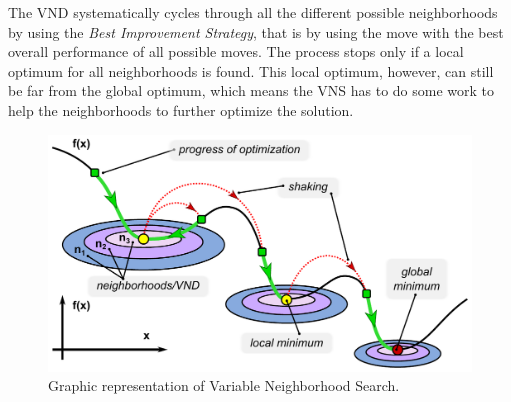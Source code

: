 \documentclass[paper = a4, fontsize = 10pt]{scrartcl}
\begin{document}
{%

The VND systematically cycles through all the different possible neighborhoods by using the \emph{Best Improvement Strategy}, that is by using the move with the best overall performance of all possible moves. The process stops only if a local optimum for all neighborhoods is found. This local optimum, however, can still be far from the global optimum, which means the VNS has to do some work to help the neighborhoods to further optimize the solution.


\begin{figure}
\begin{center}
\includegraphics[width=\textwidth]{../img/vns-english.pdf}
\end{center}
\caption{Graphic representation of Variable Neighborhood Search.}
\end{figure}

}
\end{document}
